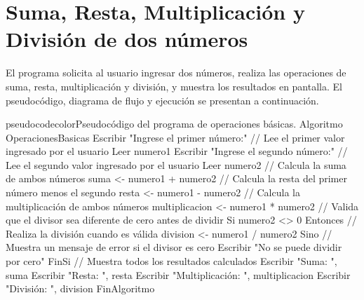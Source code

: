 \documentclass[
	spanish, %
	letterpaper, oneside
]{article}
\begin{document}


\section{Suma, Resta, Multiplicación y División de dos números}

El programa solicita al usuario ingresar dos números, realiza las operaciones de suma, resta, multiplicación y división, y muestra los resultados en pantalla. El pseudocódigo, diagrama de flujo y ejecución se presentan a continuación.

\begin{sourcecode}{pseudocodecolor}{Pseudocódigo del programa de operaciones básicas.}
Algoritmo OperacionesBasicas
    Escribir "Ingrese el primer número:"
    // Lee el primer valor ingresado por el usuario
    Leer numero1
    Escribir "Ingrese el segundo número:"
    // Lee el segundo valor ingresado por el usuario
    Leer numero2
    // Calcula la suma de ambos números
    suma <- numero1 + numero2
    // Calcula la resta del primer número menos el segundo
    resta <- numero1 - numero2
    // Calcula la multiplicación de ambos números
    multiplicacion <- numero1 * numero2
    // Valida que el divisor sea diferente de cero antes de dividir
    Si numero2 <> 0 Entonces
        // Realiza la división cuando es válida
        division <- numero1 / numero2
    Sino
        // Muestra un mensaje de error si el divisor es cero
        Escribir "No se puede dividir por cero"
    FinSi
    // Muestra todos los resultados calculados
    Escribir "Suma: ", suma
    Escribir "Resta: ", resta
    Escribir "Multiplicación: ", multiplicacion
    Escribir "División: ", division
FinAlgoritmo
\end{sourcecode}


\end{document}

